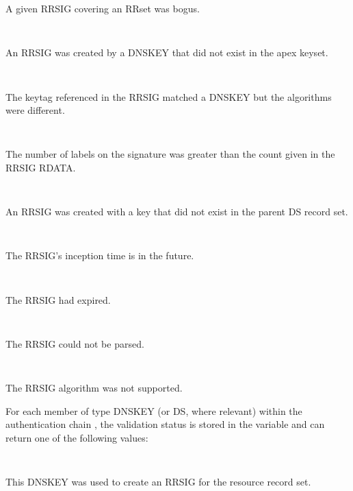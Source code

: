\begin{description}
\begin{description}
\begin{description}
A given RRSIG covering an RRset was bogus.

\item {}\verb" "

An RRSIG was created by a DNSKEY that did not exist
in the apex keyset.

\item {}\verb" "

The keytag referenced in the RRSIG matched a DNSKEY
but the algorithms were different.

\item {}\verb" "

The number of labels on the signature was greater
than the count given in the RRSIG RDATA.

\item {}\verb" "

An RRSIG was created with a key that did not exist
in the parent DS record set.

\item {}\verb" "

The RRSIG's inception time is in the future.

\item {}\verb" "

The RRSIG had expired.

\item {}\verb" "

The RRSIG could not be parsed.

\item {}\verb" "

The RRSIG algorithm was not supported.

\end{description}

For each  member of type DNSKEY (or DS, where relevant) within
the authentication chain , the validation status is stored
in the variable  and can return one of the following values:

\begin{description}
\item {}\verb" "

This DNSKEY was used to create an RRSIG for the resource record set.

\item {}\verb" "


\end{description}
\end{description}
\end{description}

